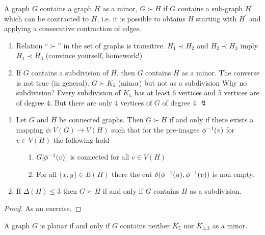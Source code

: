\documentclass[aagt.tex]{subfiles}
\begin{document}
\begin{defi*}
  A graph $G$ contains a graph $H$ as a minor, $G \succ H$ if $G$ contains a sub-graph $H^\prime$ which can be contracted to $H$, i.e. it is possible to obtains $H$ starting with $H^\prime$ and applying a consecutive contraction of edges.
\end{defi*}

\begin{rem}
  \begin{enumerate}
    \item Relation \enquote{$\succ$} in the set of graphs is transitive. $H_1 \prec H_2$ and $H_2 \prec H_3$ imply $H_1 \prec H_3$ (convince yourself, homework!)
    \item If $G$ contains a subdivision of $H$, then $G$ contains $H$ as a minor.
    The converse is not true (in general).
     $G \succ K_5$ (minor) but not as a subdivision
    Why no subdivision?
    Every subdivision of $K_5$ has at least 6 vertices and 5 vertices are of degree 4.
    But there are only 4 vertices of $G$ of degree 4 $\lightning$
  \end{enumerate}
\end{rem}

\begin{theorem}[4.10?]
  \begin{enumerate}[label=(\alph*)]
    \item Let $G$ and $H$ be connected graphs.
    Then $G \succ H$ if and only if there exists a mapping $\phi: V(G) \to V(H)$ such that for the pre-images ${\phi}^{-1}(v)$ for $v \in V(H)$ the following hold
    \begin{enumerate}%
      \item[1.] $G[{\phi}^{-1}(v)]$ is connected for all $v \in V(H)$
      \item[2.] For all $\{x,y\} \in E(H)$ there the cut $\delta({\phi}^{-1}(u),{\phi}^{-1}(v))$ is non empty.
    \end{enumerate}
    \item If $\Delta(H) \leq 3$ then $G \succ H$ if and only if $G$ contains $H$ as a subdivision.
  \end{enumerate}
\end{theorem}

\begin{proof}
  As an exercise.
\end{proof}

\begin{cor}
  A graph $G$ is planar if and only if $G$ contains neither $K_5$ nor $K_{3,3}$ as a minor.
\end{cor}
\end{document}
